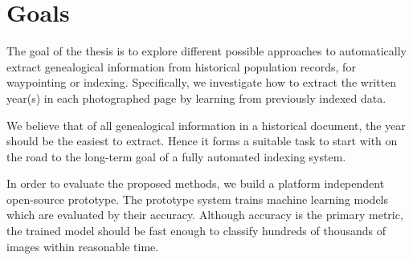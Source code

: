\section{Goals}

The goal of the thesis is to explore different possible approaches to automatically extract genealogical information from historical population records, for waypointing or indexing. Specifically, we investigate how to extract the written year(s) in each photographed page by learning from previously indexed data.

We believe that of all genealogical information in a historical document, the year should be the easiest to extract. Hence it forms a suitable task to start with on the road to the long-term goal of a fully automated indexing system.


In order to evaluate the proposed methods, we build a platform independent open-source prototype. The prototype system trains machine learning models which are evaluated by their accuracy.
Although accuracy is the primary metric, the trained model should be fast enough to classify hundreds of thousands of images within reasonable time.




